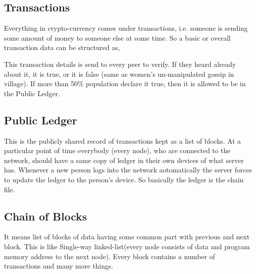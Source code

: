 \subsection{Transactions}
Everything in crypto-currency comes under transactions, i.e. someone is sending some amount of money to someone else at some time. So a basic or overall transaction data can be structured as,


This transaction details is send to every peer to verify. If they heard already about it, it is true, or it is false (same as women's un-manipulated gossip in village). If more than 50\% population declare it true, then it is allowed to be in the Public Ledger.

\subsection{Public Ledger}
This is the publicly shared record of transactions kept as a list of blocks. At a particular point of time everybody (every node), who are connected to the network, should have a same copy of ledger in their own devices of what server has. Whenever a new person logs into the network aotomatically the server forces to update the ledger to the person's device. So basically the ledger is the chain file.

\subsection{Chain of Blocks}
It means list of blocks of data having some common part with previous and next block. This is like Single-way linked-list(every node consists of data and program memory address to the next node). Every block contains a number of transactions and many more things.

